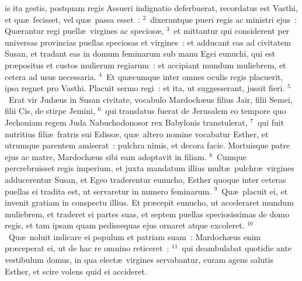 \bchapter
{}is ita gestis, postquam regis Assueri indignatio deferbuerat, recordatus est Vasthi, et qu\ae\ fecisset, vel qu\ae\ passa esset~:
${}^{2}$~dixeruntque pueri regis ac ministri ejus~: Qu\ae rantur regi puell\ae\ virgines ac specios\ae ,
${}^{3}$~et mittantur qui considerent per universas provincias puellas speciosas et virgines~: et adducant eas ad civitatem Susan, et tradant eas in domum feminarum sub manu Egei eunuchi, qui est pr\ae positus et custos mulierum regiarum~: et accipiant mundum muliebrem, et cetera ad usus necessaria.
${}^{4}$~Et qu\ae cumque inter omnes oculis regis placuerit, ipsa regnet pro Vasthi. Placuit sermo regi~: et ita, ut suggesserant, jussit fieri.
${}^{5}$~Erat vir Jud\ae us in Susan civitate, vocabulo Mardoch\ae us filius Jair, filii Semei, filii Cis, de stirpe Jemini,
${}^{6}$~qui translatus fuerat de Jerusalem eo tempore quo Jechoniam regem Juda Nabuchodonosor rex Babylonis transtulerat,
${}^{7}$~qui fuit nutritius fili\ae\ fratris sui Ediss\ae , qu\ae\ altero nomine vocabatur Esther, et utrumque parentem amiserat~: pulchra nimis, et decora facie. Mortuisque patre ejus ac matre, Mardoch\ae us sibi eam adoptavit in filiam.
${}^{8}$~Cumque percrebruisset regis imperium, et juxta mandatum illius mult\ae\ pulchr\ae\ virgines adducerentur Susan, et Egeo traderentur eunucho, Esther quoque inter ceteras puellas ei tradita est, ut servaretur in numero feminarum.
${}^{9}$~Qu\ae\ placuit ei, et invenit gratiam in conspectu illius. Et pr\ae cepit eunucho, ut acceleraret mundum muliebrem, et traderet ei partes suas, et septem puellas speciosissimas de domo regis, et tam ipsam quam pedissequas ejus ornaret atque excoleret.
${}^{10}$~Qu\ae\ noluit indicare ei populum et patriam suam~: Mardoch\ae us enim pr\ae ceperat ei, ut de hac re omnino reticeret~:
${}^{11}$~qui deambulabat quotidie ante vestibulum domus, in qua elect\ae\ virgines servabantur, curam agens salutis Esther, et scire volens quid ei accideret.


